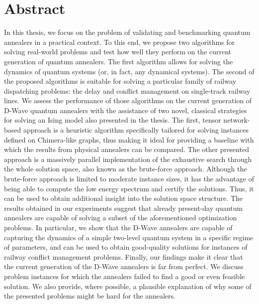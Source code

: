 \chapter{Abstract}

In this thesis, we focus on the problem of validating and benchmarking quantum annealers in a
practical context. To this end, we propose two algorithms for solving real-world problems and test how
well they perform on the current generation of quantum annealers. The first algorithm allows for
solving the dynamics of quantum systems (or, in fact, any dynamical systems). The second of the proposed
algorithms is suitable for solving a particular family of railway dispatching problems: the delay
and conflict management on single-track railway lines. We assess the performance of those
algorithms on the current generation of D-Wave quantum annealers with the assistance of two novel,
classical strategies for solving an Ising model also presented in the thesis. The first, tensor
network-based approach is a heuristic algorithm specifically tailored for solving instances defined
on Chimera-like graphs, thus making it ideal for providing a baseline with which the results from
physical annealers can be compared. The other presented approach is a massively parallel
implementation of the exhaustive search through the whole solution space, also known as the
brute-force approach. Although the brute-force approach is limited to moderate instance sizes, it
has the advantage of being able to compute the low energy spectrum and certify the solutions. Thus,
it can be used to obtain additional insight into the solution space structure. The results obtained
in our experiments suggest that already present-day quantum annealers are capable of solving a
subset of the aforementioned optimization problems. In particular, we show that the D-Wave annealers
are capable of capturing the dynamics of a simple two-level quantum system in a specific regime of
parameters, and can be used to obtain good-quality solutions for instances of railway conflict
management problems. Finally, our findings make it clear that the current generation of the D-Wave
annealers is far from perfect. We discuss problem instances for which the annealers failed to find
a good or even feasible solution. We also provide, where possible, a plausible explanation of why
some of the presented problems might be hard for the annealers.
